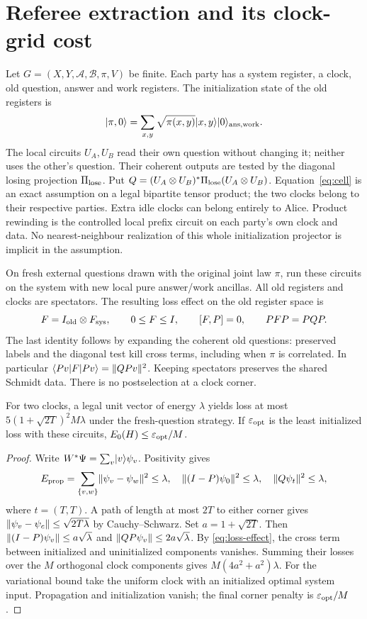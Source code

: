 \section{Referee extraction and its clock-grid cost}\label{sec:referee}
Let $G=(X,Y,\mathcal A,\mathcal B,\pi,V)$ be finite. Each party has
a system register, a clock, old question, answer and work registers.
The initialization state of the old registers is
\[
 \lvert\pi,0\rangle=\sum_{x,y}\sqrt{\pi(x,y)}\lvert x,y\rangle\lvert0\rangle_{\rm ans,work}.
\]
The local circuits $U_A,U_B$ read their own question without changing
it; neither uses the other's question. Their coherent outputs are tested
by the diagonal losing projection $\Pi_{\rm lose}$. Put
$Q=(U_A\otimes U_B)^*\Pi_{\rm lose}(U_A\otimes U_B)$.
Equation~\eqref{eq:cell} is an exact assumption on a legal bipartite
tensor product; the two clocks belong to their respective parties.
Extra idle clocks can belong entirely to Alice. Product rewinding is
the controlled local prefix circuit on each party's own clock and data.
No nearest-neighbour realization of this whole initialization projector
is implicit in the assumption.

On fresh external questions drawn with the original joint law $\pi$,
run these circuits on the system with new local pure answer/work
ancillas. All old registers and clocks are spectators. The resulting
loss effect on the old register space is
\begin{equation}\label{eq:loss-effect}
 F=I_{\rm old}\otimes F_{\rm sys},\qquad 0\leq F\leq I,
 \qquad [F,P]=0,\qquad PFP=PQP.
\end{equation}
The last identity follows by expanding the coherent old questions:
preserved labels and the diagonal test kill cross terms, including
when $\pi$ is correlated. In particular
$\langle Pv\rvert F\lvert Pv\rangle=\lVert QPv\rVert^2$.
Keeping spectators preserves the shared Schmidt data. There is no
postselection at a clock corner.

\begin{lemma}\label{lem:elementary}
For two clocks, a legal unit vector of energy $\lambda$ yields loss
at most $5(1+\sqrt{2T})^2M\lambda$ under the fresh-question strategy.
If $\varepsilon_{\rm opt}$ is the least initialized loss with these circuits,
$E_0(H)\leq\varepsilon_{\rm opt}/M$.
\end{lemma}
\begin{proof}
Write $W^*\Psi=\sum_v\lvert v\rangle\psi_v$. Positivity gives
\[
 E_{\rm prop}=\sum_{\{v,w\}}\lVert\psi_v-\psi_w\rVert^2\leq\lambda,
 \quad\lVert(I-P)\psi_0\rVert^2\leq\lambda,
 \quad\lVert Q\psi_t\rVert^2\leq\lambda,
\]
where $t=(T,T)$. A path of length at most $2T$ to either corner gives
$\lVert\psi_v-\psi_c\rVert\leq\sqrt{2T\lambda}$ by Cauchy--Schwarz.
Set $a=1+\sqrt{2T}$. Then
$\lVert(I-P)\psi_v\rVert\leq a\sqrt\lambda$ and
$\lVert QP\psi_v\rVert\leq2a\sqrt\lambda$.
By \eqref{eq:loss-effect}, the cross term between initialized and
uninitialized components vanishes. Summing their losses over the $M$
orthogonal clock components gives $M(4a^2+a^2)\lambda$.
For the variational bound take the uniform clock with an initialized
optimal system input. Propagation and initialization vanish; the final
corner penalty is $\varepsilon_{\rm opt}/M$.
\end{proof}

